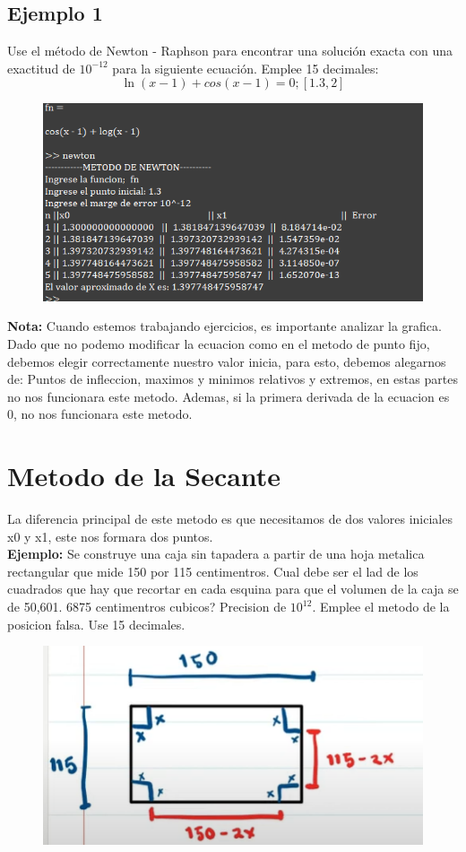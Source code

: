 \documentclass{article}
\theoremstyle{mytheoremstyle}
\theoremstyle{mytheoremstyle}
\theoremstyle{myproblemstyle}
\begin{document}
    \subsection*{Ejemplo 1}
    Use el método de Newton - Raphson para encontrar una solución exacta con una exactitud de $10^{-12}$ para la siguiente ecuación. Emplee 15 decimales: 
    \[
        \ln(x-1)+cos(x-1)=0 ; [1.3,2]
    \]
    \begin{figure}[ht]
        \includegraphics*[scale=0.9]{img/ejemplo3.png}
    \end{figure}
    
    \textbf{Nota:} Cuando estemos trabajando ejercicios, es importante analizar la grafica. Dado que no podemo modificar la ecuacion como en el metodo de punto fijo, debemos elegir correctamente nuestro valor inicia,
    para esto, debemos alegarnos de: Puntos de infleccion, maximos y minimos relativos y extremos, en estas partes no nos funcionara este metodo.
    Ademas, si la primera derivada de la ecuacion es 0, no nos funcionara este metodo.
\pagebreak
\section*{Metodo de la Secante}
La diferencia principal de este metodo es que necesitamos de dos valores iniciales x0 y x1, este nos formara dos puntos.
\\ \textbf{Ejemplo:} Se construye una caja sin tapadera a partir de una hoja metalica rectangular que mide 150 por 115 centimentros. Cual debe ser el lad de los cuadrados que hay que recortar en cada esquina para que
el volumen de la caja se de 50,601. 6875 centimentros cubicos? Precision de $10^{12}$. Emplee el metodo de la posicion falsa. Use 15 decimales.

\begin{figure}[ht]
    \includegraphics*[scale=1]{img/secante1.png}
\end{figure}
\end{document}
